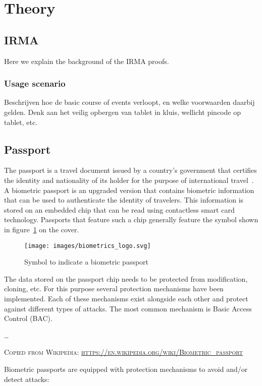 \section{Theory}
\subsection{IRMA}
Here we explain the background of the IRMA proofs.

\subsubsection{Usage scenario}
Beschrijven hoe de basic course of events verloopt, en welke voorwaarden daarbij gelden. Denk aan het veilig opbergen van tablet in kluis, wellicht pincode op tablet, etc.

\subsection{Passport}
The passport is a travel document issued by a country's government that certifies the identity and nationality of its holder for the purpose of international travel~\cite{passportdefinition}. A biometric passport is an upgraded version that contains biometric information that can be used to authenticate the identity of travelers. This information is stored on an embedded chip that can be read using contactless smart card technology. Passports that feature such a chip generally feature the symbol shown in figure~\ref{fig:biometricslogo} on the cover.

\begin{figure}[htb]
	\centering
		\texttt{[image: images/biometrics\_logo.svg]}
	\caption{Symbol to indicate a biometric passport}
	\label{fig:biometricslogo}
\end{figure}

The data stored on the passport chip needs to be protected from modification, cloning, etc. For this purpose several protection mechanisms have been implemented. Each of these mechanisms exist alongside each other and protect against different types of attacks. The most common mechanism is Basic Access Control (BAC). 

\ldots

\textsc{Copied from Wikipedia: \url{https://en.wikipedia.org/wiki/Biometric_passport}} 

Biometric passports are equipped with protection mechanisms to avoid and/or detect attacks:

